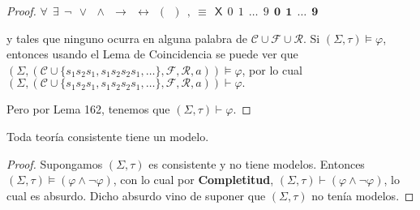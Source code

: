 \begin{proof}
    $\displaystyle \forall \ \ \exists \ \ \lnot \ \ \vee \ \ \wedge \ \ \rightarrow \ \ \leftrightarrow \ \ (\ \ )\ \ ,\ \equiv \ \ \mathsf{X}\ \ \mathit{0}\ \ \mathit{1}\ \ \dotsc\ \ \mathit{9}\ \ \mathbf{0}\ \ \mathbf{1}\ \ \dotsc\ \ \mathbf{9} $

    y tales que ninguno ocurra en alguna palabra de $\mathcal{C}\cup \mathcal{F} \cup \mathcal{R}.$ Si $(\Sigma, \tau)\models \varphi $, entonces usando el Lema de Coincidencia se puede ver que $(\Sigma ,(\mathcal{C}\cup \{s_{1}s_{2}s_{1},s_{1}s_{2}s_{2}s_{1},\dotsc\},\mathcal{F},\mathcal{R} ,a))\models \varphi $, por lo cual
    $\displaystyle (\Sigma ,(\mathcal{C}\cup \{s_{1}s_{2}s_{1},s_{1}s_{2}s_{2}s_{1},\dotsc\}, \mathcal{F},\mathcal{R},a))\vdash \varphi . $

    Pero por Lema 162, tenemos que $(\Sigma, \tau)\vdash \varphi .$
  \end{proof}

  \begin{corollary} \label{corollary_83}
    \PN Toda teoría consistente tiene un modelo.
  \end{corollary}
  \begin{proof}
    \PN Supongamos $(\Sigma, \tau)$ es consistente y no tiene modelos. Entonces $(\Sigma, \tau) \models \left(\varphi
    \wedge \lnot \varphi \right) $, con lo cual por \textbf{Completitud}, $(\Sigma, \tau) \vdash \left(\varphi \wedge
    \lnot \varphi \right)$, lo cual es absurdo. Dicho absurdo vino de suponer que $(\Sigma, \tau)$ no tenía modelos.
  \end{proof}

